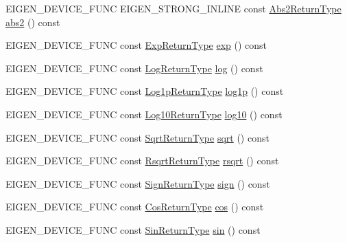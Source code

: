 \begin{DoxyCompactItemize}
\item 
E\+I\+G\+E\+N\+\_\+\+D\+E\+V\+I\+C\+E\+\_\+\+F\+U\+NC E\+I\+G\+E\+N\+\_\+\+S\+T\+R\+O\+N\+G\+\_\+\+I\+N\+L\+I\+NE const \mbox{\hyperlink{class_eigen_1_1_cwise_unary_op}{Abs2\+Return\+Type}} \mbox{\hyperlink{class_eigen_1_1_array_base_ad213e9822777ff03219eed7063c26971}{abs2}} () const
\item 
E\+I\+G\+E\+N\+\_\+\+D\+E\+V\+I\+C\+E\+\_\+\+F\+U\+NC const \mbox{\hyperlink{class_eigen_1_1_cwise_unary_op}{Exp\+Return\+Type}} \mbox{\hyperlink{class_eigen_1_1_array_base_a7b262ecb3e4db0f87d2eae85f2d64f15}{exp}} () const
\item 
E\+I\+G\+E\+N\+\_\+\+D\+E\+V\+I\+C\+E\+\_\+\+F\+U\+NC const \mbox{\hyperlink{class_eigen_1_1_cwise_unary_op}{Log\+Return\+Type}} \mbox{\hyperlink{class_eigen_1_1_array_base_a7748ba1f6891fa4e10723a8bf77b8770}{log}} () const
\item 
E\+I\+G\+E\+N\+\_\+\+D\+E\+V\+I\+C\+E\+\_\+\+F\+U\+NC const \mbox{\hyperlink{class_eigen_1_1_cwise_unary_op}{Log1p\+Return\+Type}} \mbox{\hyperlink{class_eigen_1_1_array_base_a438640146f3e7488f09a4f60c305b1d9}{log1p}} () const
\item 
E\+I\+G\+E\+N\+\_\+\+D\+E\+V\+I\+C\+E\+\_\+\+F\+U\+NC const \mbox{\hyperlink{class_eigen_1_1_cwise_unary_op}{Log10\+Return\+Type}} \mbox{\hyperlink{class_eigen_1_1_array_base_a3ea6653e344e9233ccba8648ffc6389a}{log10}} () const
\item 
E\+I\+G\+E\+N\+\_\+\+D\+E\+V\+I\+C\+E\+\_\+\+F\+U\+NC const \mbox{\hyperlink{class_eigen_1_1_cwise_unary_op}{Sqrt\+Return\+Type}} \mbox{\hyperlink{class_eigen_1_1_array_base_aef292634cdf57e09ee29c758deff8251}{sqrt}} () const
\item 
E\+I\+G\+E\+N\+\_\+\+D\+E\+V\+I\+C\+E\+\_\+\+F\+U\+NC const \mbox{\hyperlink{class_eigen_1_1_cwise_unary_op}{Rsqrt\+Return\+Type}} \mbox{\hyperlink{class_eigen_1_1_array_base_aa978767ac25c6d708d7ac41524f75252}{rsqrt}} () const
\item 
E\+I\+G\+E\+N\+\_\+\+D\+E\+V\+I\+C\+E\+\_\+\+F\+U\+NC const \mbox{\hyperlink{class_eigen_1_1_cwise_unary_op}{Sign\+Return\+Type}} \mbox{\hyperlink{class_eigen_1_1_array_base_a756077be83779c575e95deb4361a6dd6}{sign}} () const
\item 
E\+I\+G\+E\+N\+\_\+\+D\+E\+V\+I\+C\+E\+\_\+\+F\+U\+NC const \mbox{\hyperlink{class_eigen_1_1_cwise_unary_op}{Cos\+Return\+Type}} \mbox{\hyperlink{class_eigen_1_1_array_base_abe1bff4421b16e62e75f932b83c4d31f}{cos}} () const
\item 
E\+I\+G\+E\+N\+\_\+\+D\+E\+V\+I\+C\+E\+\_\+\+F\+U\+NC const \mbox{\hyperlink{class_eigen_1_1_cwise_unary_op}{Sin\+Return\+Type}} \mbox{\hyperlink{class_eigen_1_1_array_base_a8f857f93533ac386282f47c5ef05459a}{sin}} () const

\end{DoxyCompactItemize}
